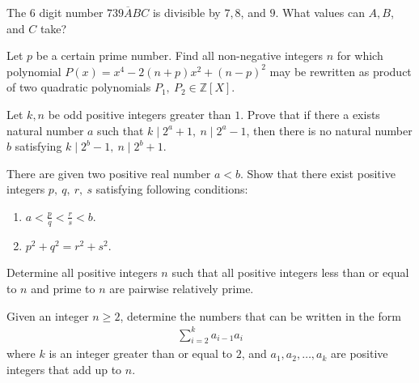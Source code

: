 \begin{problem}
	The $6$ digit number $\overline{739ABC}$ is divisible by $7, 8$, and $9$. What values can $A, B$, and $C$ take?
\end{problem}

\begin{problem}
	Let $p$ be a certain prime number. Find all non-negative integers $n$ for which polynomial $P(x)=x^4-2(n+p)x^2+(n-p)^2$ may be rewritten as product of two quadratic polynomials $P_1, \ P_2 \in \mathbb{Z}[X]$. %
\end{problem}

\begin{problem}
	Let $k, n$ be odd positive integers greater than $1$. Prove that if there a exists natural number $a$ such that $k\mid 2^a+1, \ n\mid 2^a-1$, then there is no natural number $b$ satisfying $k\mid 2^b-1, \ n\mid 2^b+1$. %
\end{problem}

\begin{problem}
	There are given two positive real number $a<b$. Show that there exist positive integers $p, \ q, \ r, \ s$ satisfying following conditions:
	\begin{enumerate}
		\item $a< \frac{p}{q} < \frac{r}{s} < b$.
		\item $p^2+q^2=r^2+s^2$.
	\end{enumerate}
\end{problem}

\begin{problem}
	Determine all positive integers $n$ such that all positive integers less than or equal to $n$ and prime to $n$ are pairwise relatively prime.
\end{problem}

\begin{problem}
	Given an integer $n \geq 2$, determine the numbers that can be written in
	the form
		\begin{align*}
			\sum_{i=2}^{k} a_{i-1}a_i
		\end{align*}
	where $k$ is an integer greater than or equal to $2$, and $a_1,a_2,\dots, a_k$ are positive integers that add up to $n$.
\end{problem}


